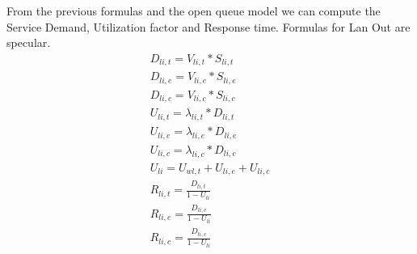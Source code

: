 \documentclass[11pt]{article}
\begin{document}
From the previous formulas and the open queue model we can compute the Service Demand, Utilization factor and Response time. Formulas for Lan Out are specular.
\begin{equation}
    \begin{array}{l}
        D_{li, t} = V_{li, t} * S_{li, t} \\
        D_{li, e} = V_{li, e} * S_{li, e} \\
        D_{li, c} = V_{li, c} * S_{li, c} \\
        U_{li, t} = \lambda_{li, t} * D_{li, t} \\
        U_{li, e} = \lambda_{li, e} * D_{li, e} \\
        U_{li, c} = \lambda_{li, c} * D_{li, c} \\
        U_{li} = U_{wl, t} + U_{li, e} + U_{li, c} \\
        R_{li, t} = \frac{D_{li, t}}{1 - U_{li}} \\
        R_{li, e} = \frac{D_{li, e}}{1 - U_{li}} \\
        R_{li, c} = \frac{D_{li, c}}{1 - U_{li}} \\
    \end{array}
\end{equation}
\end{document}
